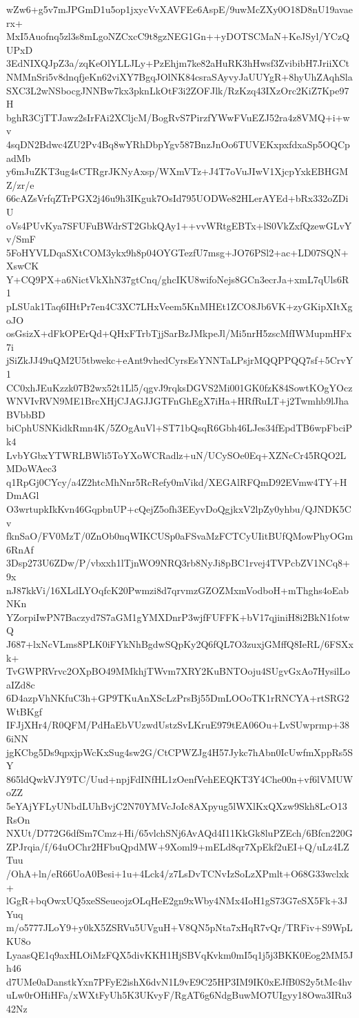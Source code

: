 wZw6+g5v7mJPGmD1u5op1jxycVvXAVFEe6AspE/9uwMcZXy0O18D8nU19avaerx+
MxI5Auofnq5zl3s8mLgoNZCxcC9t8gzNEG1Gn++yDOTSCMaN+KeJSyl/YCzQUPxD
3EdNIXQJpZ3a/zqKeOlYLLJLy+PzEhjm7ke82aHuRK3hHwsf3ZvibibH7JriiXCt
NMMnSri5v8dnqfjeKn62viXY7BgqJOlNK84csraSAyvyJaUUYgR+8hyUhZAqhSla
SXC3L2wNSbocgJNNBw7kx3pknLkOtF3i2ZOFJlk/RzKzq43IXzOrc2KiZ7Kpe97H
bghR3CjTTJawz2sIrFAi2XCljcM/BogRvS7PirzfYWwFVuEZJ52ra4z8VMQ+i+wv
4sqDN2Bdwc4ZU2Pv4Bq8wYRhDbpYgv587BnzJnOo6TUVEKxpxfdxaSp5OQCpadMb
y6mJuZKT3ug4sCTRgrJKNyAxsp/WXmVTz+J4T7oVuJIwV1XjcpYxkEBHGMZ/zr/e
66cAZsVrfqZTrPGX2j46u9h3IKguk7OsId795UODWe82HLerAYEd+bRx332oZDiU
oVs4PUvKya7SFUFuBWdrST2GbkQAy1++vvWRtgEBTx+lS0VkZxfQzewGLvYv/SmF
5FoHYVLDqaSXtCOM3ykx9h8p04OYGTezfU7msg+JO76PSl2+ac+LD07SQN+XswCK
Y+CQ9PX+a6NictVkXhN37gtCnq/ghcIKU8wifoNejs8GCn3ecrJa+xmL7qUls6R1
pLSUak1Taq6IHtPr7en4C3XC7LHxVeem5KnMHEt1ZCO8Jb6VK+zyGKipXItXgoJO
osGsizX+dFkOPErQd+QHxFTrbTjjSarBzJMkpeJl/Mi5nrH5zscMfIWMupmHFx7i
jSiZkJJ49uQM2U5tbwekc+eAnt9vhedCyrsEsYNNTaLPsjrMQQPPQQ7sf+5CrvY1
CC0xhJEuKzzk07B2wx52t1Ll5/qgvJ9rqksDGVS2Mi001GK0fzK84SowtKOgYOcz
WNVIvRVN9ME1BrcXHjCJAGJJGTFnGhEgX7iHa+HRfRuLT+j2Twmhb9lJhaBVbbBD
biCphUSNKidkRmn4K/5ZOgAuVl+ST71bQsqR6Gbh46LJes34fEpdTB6wpFbciPk4
LvbYGbxYTWRLBWli5ToYXoWCRadlz+uN/UCySOe0Eq+XZNcCr45RQO2LMDoWAec3
q1RpGj0CYcy/a4Z2htcMhNnr5RcRefy0mVikd/XEGAlRFQmD92EVmw4TY+HDmAGl
O3wrtupkIkKvn46GqpbnUP+cQejZ5ofh3EEyvDoQgjkxV2lpZy0yhbu/QJNDK5Cv
fknSaO/FV0MzT/0ZnOb0nqWIKCUSp0aFSvaMzFCTCyUIitBUfQMowPhyOGm6RnAf
3Dsp273U6ZDw/P/vbxxh1lTjnWO9NRQ3rb8NyJi8pBC1rvej4TVPcbZV1NCq8+9x
nJ87kkVi/16XLdLYOqfcK20Pwmzi8d7qrvmzGZOZMxmVodboH+mThghs4oEabNKn
YZorpiIwPN7Baczyd7S7aGM1gYMXDnrP3wjfFUFFK+bV17qjiniH8i2BkN1fotwQ
J687+lxNcVLms8PLK0iFYkNhBgdwSQpKy2Q6fQL7O3zuxjGMffQ8IeRL/6FSXxk+
TvGWPRVrvc2OXpBO49MMkhjTWvm7XRY2KuBNTOoju4SUgvGxAo7HysilLoaIZd8c
6D4azpVhNKfuC3h+GP9TKuAnXScLzPrsBj55DmLOOoTK1rRNCYA+rtSRG2WtBKgf
IFJjXHr4/R0QFM/PdHaEbVUzwdUstzSvLKruE979tEA06Ou+LvSUwprmp+386iNN
jgKCbg5Ds9qpxjpWcKxSug4sw2G/CtCPWZJg4H57Jykc7hAbn0IcUwfmXppRs5SY
865ldQwkVJY9TC/Uud+npjFdINfHL1zOenfVehEEQKT3Y4Che00n+vf6lVMUWoZZ
5eYAjYFLyUNbdLUhBvjC2N70YMVcJoIc8AXpyug5lWXlKxQXzw9Skh8LcO13RsOn
NXUt/D772G6dfSm7Cmz+Hi/65vlchSNj6AvAQd4I11KkGk8luPZEch/6Bfcn220G
ZPJrqia/f/64uOChr2HFbuQpdMW+9Xoml9+mELd8qr7XpEkf2uEI+Q/uLz4LZTuu
/OhA+ln/eR66UoA0Besi+1u+4Lck4/z7LsDvTCNvIzSoLzXPmlt+O68G33wclxk+
lGgR+bqOwxUQ5xeSSeueojzOLqHeE2gn9xWby4NMx4IoH1gS73G7eSX5Fk+3JYuq
m/o5777JLoY9+y0kX5ZSRVu5UVguH+V8QN5pNta7xHqR7vQr/TRFiv+S9WpLKU8o
LyaasQE1q9axHLOiMzFQX5divKKH1HjSBVqKvkm0mI5q1j5j3BKK0Eog2MM5Jh46
d7UMe0aDanstkYxn7PFyE2ishX6dvN1L9vE9C25HP3IM9IK0xEJfB0S2y5tMc4hv
uLw0rOHiHFa/xWXtFyUh5K3UKvyF/RgAT6g6NdgBuwMO7UIgyy18Owa3IRu342Nz
